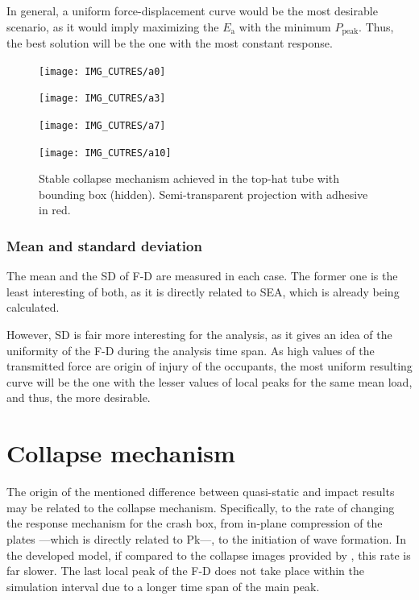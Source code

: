 \documentclass[cmfonts]{witpress}
\begin{document}
In general, a uniform force-displacement curve would be the most desirable scenario, as it would imply maximizing the $E_\text{a}$  with the minimum $P_\text{peak}$. Thus, the best solution will be the one with the most constant response.

\begin{figure}
	\centering
	\begin{minipage}[b]{.15\linewidth}
		\centering
		\texttt{[image: IMG\_CUTRES/a0]}
	\end{minipage}
	\hfill
	\begin{minipage}[b]{.15\linewidth}
		\centering
		\texttt{[image: IMG\_CUTRES/a3]}
	\end{minipage}
	\hfill
	\begin{minipage}[b]{.15\linewidth}
		\centering
		\texttt{[image: IMG\_CUTRES/a7]}
	\end{minipage}
	\hfill
	\begin{minipage}[b]{.15\linewidth}
		\centering
		\texttt{[image: IMG\_CUTRES/a10]}
	\end{minipage}
	\caption[Stable collapse mechanism achieved in the top-hat tube with bounding box.]{Stable collapse mechanism achieved in the top-hat tube with bounding box (hidden). Semi-transparent projection with adhesive in red.}
	\label{fig:stable}
\end{figure}

\subsubsection{Mean and standard deviation}

The mean and the SD of F-D are measured in each case. The former one is the least interesting of both, as it is directly related to SEA, which is already being calculated.

However, SD is fair more interesting for the analysis, as it gives an idea of the uniformity of the F-D during the analysis time span. As high values of the transmitted force are origin of injury of the occupants, the most uniform resulting curve will be the one with the lesser values of local peaks for the same mean load, and thus, the more desirable.

\section{Collapse mechanism}

The origin of the mentioned difference between quasi-static and impact results may be related to the collapse mechanism. Specifically, to the rate of changing the response mechanism for the crash box, from in-plane compression of the plates ---which is directly related to Pk---, to the initiation of wave formation. In the developed model, if compared to the collapse images provided by \cite{Scattina2011}, this rate is far slower. The last local peak of the F-D does not take place within the simulation interval due to a longer time span of the main peak.
\end{document}
